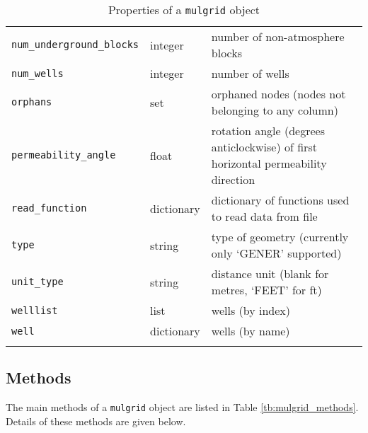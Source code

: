 \begin{center}
\begin{longtable}{|l|l|p{75mm}|}
    \texttt{num\_underground\_blocks} & integer & number of non-atmosphere blocks\\
    \texttt{num\_wells} & integer & number of wells\\
    \texttt{orphans} & set & orphaned nodes (nodes not belonging to any column)\\
    \texttt{permeability\_angle} & float & rotation angle (degrees anticlockwise) of first horizontal permeability direction \\
    \texttt{read\_function} & dictionary & dictionary of functions used to read data from file\\
    \texttt{type} & string  & type of geometry (currently only `GENER' supported)\\
    \texttt{unit\_type} & string & distance unit (blank for metres, `FEET' for ft)\\
    \texttt{welllist} & list & wells (by index)\\
    \texttt{well} & dictionary & wells (by name)\\
    \hline
    \caption{Properties of a \texttt{mulgrid} object}
    \label{tb:mulgrid_properties}
  \end{longtable}
\end{center}

\subsection{Methods}
\label{mulgridmethods}

The main methods of a \texttt{mulgrid} object are listed in Table \ref{tb:mulgrid_methods}.  Details of these methods are given below.

